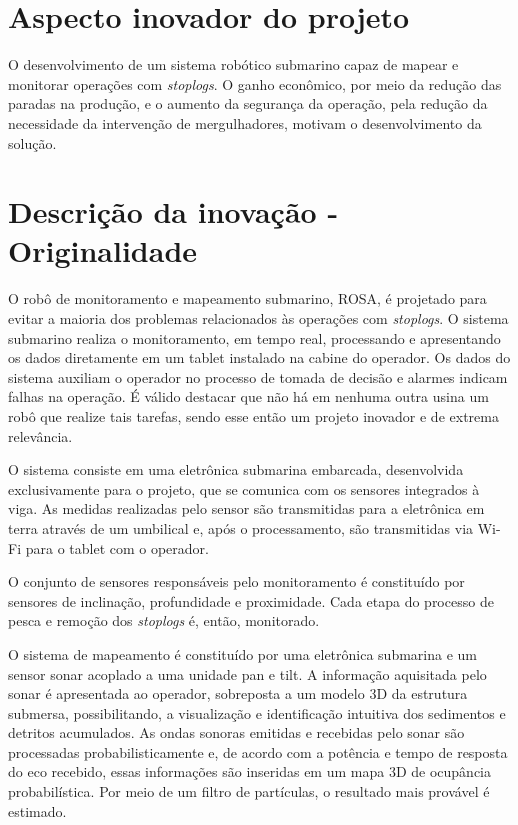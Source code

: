 \section{Aspecto inovador do projeto}

O desenvolvimento de um sistema robótico submarino capaz de mapear e monitorar
operações com \textit{stoplogs}. O ganho econômico, por meio da
redução das paradas na produção, e o aumento da segurança da operação,
pela redução da necessidade da intervenção de mergulhadores, motivam o
desenvolvimento da solução.

\section{Descrição da inovação - Originalidade}

O robô de monitoramento e mapeamento submarino, ROSA, é projetado para evitar a
maioria dos problemas relacionados às operações com \textit{stoplogs}. O sistema
submarino realiza o monitoramento, em tempo real, processando e apresentando os
dados diretamente em um tablet instalado na cabine do operador. Os dados do
sistema auxiliam o operador no processo de tomada de decisão e alarmes indicam
falhas na operação. É válido destacar que não há em nenhuma outra usina um robô
que realize tais tarefas, sendo esse então um projeto inovador e de extrema
relevância. 

O sistema consiste em uma eletrônica submarina embarcada, desenvolvida
exclusivamente para o projeto, que se comunica com os sensores integrados à
viga. As medidas realizadas pelo sensor são transmitidas para a
eletrônica em terra através de um umbilical e, após o processamento, são
transmitidas via Wi-Fi para o tablet com o operador.

O conjunto de sensores responsáveis pelo monitoramento é constituído por
sensores de inclinação, profundidade e proximidade. Cada etapa do processo de
pesca e remoção dos \textit{stoplogs} é, então, monitorado.

O sistema de mapeamento é constituído por uma eletrônica submarina e um sensor
sonar acoplado a uma unidade pan e tilt. A informação aquisitada pelo sonar é
apresentada ao operador, sobreposta a um modelo 3D da estrutura submersa, possibilitando, a
visualização e identificação intuitiva dos sedimentos e detritos acumulados.
As ondas sonoras emitidas e recebidas pelo sonar são processadas 
probabilisticamente e, de acordo com a potência e tempo de resposta
do eco recebido, essas informações são inseridas em um mapa 3D de ocupância
probabilística. Por meio de um filtro de partículas, o resultado mais provável
é estimado.

